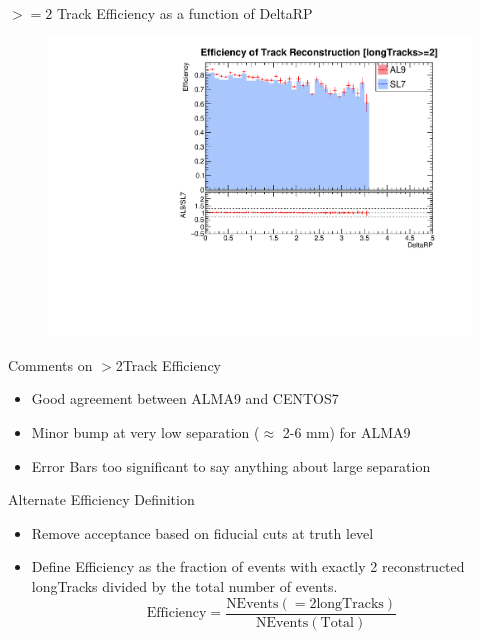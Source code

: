 \begin{frame}{$>=2$ Track Efficiency as a function of DeltaRP}
    \begin{figure}
        \includegraphics[width=\linewidth]{./output/Effi_greq2_DeltaRP.pdf}
    \end{figure}
\end{frame}

\begin{frame}{Comments on $>$2Track Efficiency}
    \begin{itemize}
        \item Good agreement between ALMA9 and CENTOS7
        \item Minor bump at very low separation ($\approx$ 2-6 mm) for ALMA9 
        \item Error Bars too significant to say anything about large separation
    \end{itemize}
\end{frame}

\begin{frame}{Alternate Efficiency Definition}
    \begin{itemize}
        \item Remove acceptance based on fiducial cuts at truth level
        \item Define Efficiency as the fraction of events with exactly 2 reconstructed longTracks divided by the total number of events. 
        \[ \text{Efficiency} = \frac{\text{NEvents}({= 2 \text{longTracks}})}{\text{NEvents}({\text{Total}})} \]
    \end{itemize}
\end{frame}


